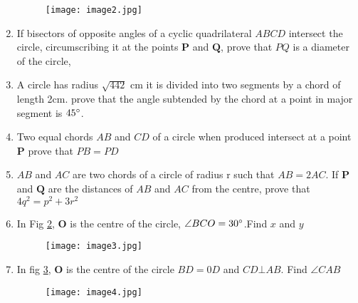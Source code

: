 \documentclass[12pt]{article}
\let\vec\mathbf
\begin{document}
\begin{enumerate}
	\begin{figure}[h!]                        \begin{center}                                   \texttt{[image: image2.jpg]}                          \end{center}                            \caption{}                                       \label{fig:2}                    \end{figure}
	\item If bisectors of opposite angles of a cyclic quadrilateral $ABCD$ intersect the circle, circumscribing it at the points $\vec{P}$ and $\vec{Q}$, prove that $PQ$ is a diameter of the circle,
\item A circle has radius $\sqrt{442}$ cm it is divided into two segments by a chord of length 2cm. prove that the angle subtended by the chord at a point in major segment is $45\degree$.
\item Two equal chords $AB$ and $CD$ of a circle when produced intersect at a point $\vec{P}$ prove that $PB=PD$
\item $AB$ and $AC$ are two chords of a circle of radius r such that $AB=2AC$. If $\vec{P}$ and $\vec{Q}$ are the distances of $AB$ and $AC$ from the centre, prove that $4q^2=p^2+3r^2$
\item In Fig \ref{fig:3}, $\vec{O}$ is the centre of the circle, $\angle BCO=30\degree$.Find $x$ and $y$
	\begin{figure}[h!]                        \begin{center}                                   \texttt{[image: image3.jpg]}                          \end{center}                            \caption{}                                       \label{fig:3}                    \end{figure}
	\item In fig \ref{fig:4}, $\vec{O}$ is the centre of the circle $BD=0D$ and $CD \bot AB$. Find $\angle CAB$
	\begin{figure}[h!]                        \begin{center}                                   \texttt{[image: image4.jpg]}                          \end{center}                            \caption{}                                       \label{fig:4}                    \end{figure}
\end{enumerate}

	
\end{document}
